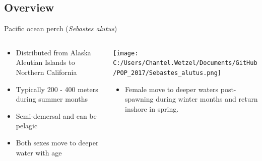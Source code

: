 \documentclass[pdf]{beamer}\usepackage[]{graphicx}\usepackage[]{color}
\begin{document}
\subsection{Overview}
\begin{frame}{Pacific ocean perch (\textit{Sebastes alutus})}
\begin{columns}
  \begin{column}{0.5\textwidth}
      \begin{itemize}
        \item Distributed from  Alaska Aleutian Islands to Northern California
        \item Typically 200 - 400 meters during summer months
        \item Semi-demersal and can be pelagic
        \item Both sexes move to deeper water with age
      \end{itemize}
  \end{column}
  
  \begin{column}{0.5\textwidth}
    \texttt{[image: C:/Users/Chantel.Wetzel/Documents/GitHub/POP\_2017/Sebastes\_alutus.png]}
    \begin{itemize}
        \item Female move to deeper waters post-spawning during winter months and return inshore in spring.
      \end{itemize}
  \end{column}
\end{columns}
\end{frame}
\end{document}
